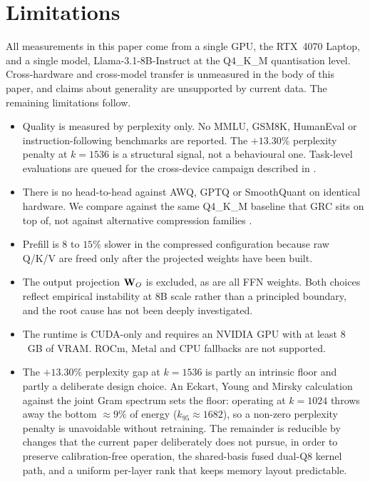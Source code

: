 \documentclass[11pt]{article}
\begin{document}
\section{Limitations}
\label{sec:limits}

All measurements in this paper come from a single GPU, the RTX~4070
Laptop, and a single model, Llama-3.1-8B-Instruct at the Q4\_K\_M
quantisation level. Cross-hardware and cross-model transfer is unmeasured
in the body of this paper, and claims about generality are unsupported by
current data. The remaining limitations follow.

\begin{itemize}
\item Quality is measured by perplexity only. No MMLU, GSM8K, HumanEval
or instruction-following benchmarks are reported. The $+13.30\%$
perplexity penalty at $k{=}1536$ is a structural signal, not a
behavioural one. Task-level evaluations are queued for the cross-device
campaign described in .
\item There is no head-to-head against AWQ, GPTQ or SmoothQuant on
identical hardware. We compare against the same Q4\_K\_M baseline that
GRC sits on top of, not against alternative compression families
\cite{lin2023awq,frantar2022gptq,xiao2022smoothquant}.
\item Prefill is $8$ to $15\%$ slower in the compressed configuration
because raw Q/K/V are freed only after the projected weights have been
built.
\item The output projection $\mathbf{W}_O$ is excluded, as are all FFN
weights. Both choices reflect empirical instability at 8B scale rather
than a principled boundary, and the root cause has not been deeply
investigated.
\item The runtime is CUDA-only and requires an NVIDIA GPU with at least
$8$~GB of VRAM. ROCm, Metal and CPU fallbacks are not supported.
\item The $+13.30\%$ perplexity gap at $k{=}1536$ is partly an
intrinsic floor and partly a deliberate design choice. An Eckart, Young
and Mirsky calculation against the joint Gram spectrum sets the floor:
operating at $k{=}1024$ throws away the bottom ${\approx}9\%$ of energy
($k_{95}{\approx}1682$), so a non-zero perplexity penalty is unavoidable
without retraining. The remainder is reducible by changes that the
current paper deliberately does not pursue, in order to preserve
calibration-free operation, the shared-basis fused dual-Q8 kernel path,
and a uniform per-layer rank that keeps memory layout predictable.

\end{itemize}
\end{document}
